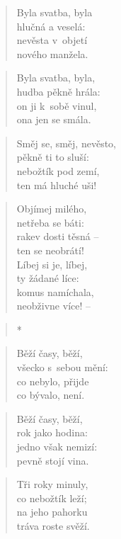 \begin{verse}
Byla svatba, byla \\
hlučná a veselá: \\
nevěsta v~objetí \\
nového manžela.
\end{verse}

\begin{verse}
Byla svatba, byla, \\
hudba pěkně hrála: \\
on ji k~sobě vinul, \\
ona jen se smála.
\end{verse}

\begin{verse}
Směj se, směj, nevěsto, \\
pěkně ti to sluší: \\
nebožtík pod zemí, \\
ten má hluché uši!
\end{verse}

\begin{verse}
Objímej milého, \\
netřeba se báti: \\
rakev dosti těsná -- \\
ten se neobrátí! \\
Líbej si je, líbej, \\
ty žádané líce: \\
komus namíchala, \\
neobživne více! --
\end{verse}

\begin{verse}
*
\end{verse}

\begin{verse}
Běží časy, běží, \\
všecko s~sebou mění: \\
co nebylo, přijde \\
co bývalo, není.
\end{verse}

\begin{verse}
Běží časy, běží, \\
rok jako hodina: \\
jedno však nemizí: \\
pevně stojí vina.
\end{verse}

\begin{verse}
Tři roky minuly, \\
co nebožtík leží; \\
na jeho pahorku \\
tráva roste svěží.
\end{verse}

